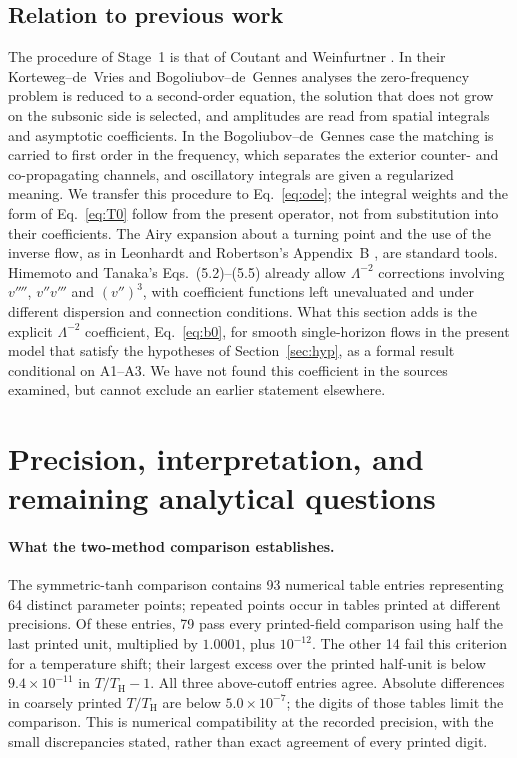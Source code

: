 \documentclass[10pt,a4paper]{article}
\newcommand{\HawkingT}{T_{\mathrm H}}
\begin{document}
\subsection{Relation to previous work}
The procedure of Stage~1 is that of Coutant and Weinfurtner
\cite{CWKdV,CWBdG}. In their Korteweg--de~Vries and Bogoliubov--de~Gennes
analyses the zero-frequency problem is reduced to a second-order equation,
the solution that does not grow on the subsonic side is selected, and
amplitudes are read from spatial integrals and asymptotic coefficients. In
the Bogoliubov--de~Gennes case the matching is carried to first order in
the frequency, which separates the exterior counter- and co-propagating
channels, and oscillatory integrals are given a regularized meaning. We transfer this procedure to Eq.~\eqref{eq:ode};
the integral weights and the form of Eq.~\eqref{eq:T0} follow from the
present operator, not from substitution into their coefficients. The Airy
expansion about a turning point and the use of the inverse flow, as in
Leonhardt and Robertson's Appendix~B \cite{LR}, are standard tools.
Himemoto and Tanaka's Eqs.~(5.2)--(5.5) \cite{HT} already allow
$\Lambda^{-2}$ corrections involving $v''''$, $v''v'''$ and $(v'')^3$,
with coefficient functions left unevaluated and under different dispersion
and connection conditions. What this section adds is the explicit
$\Lambda^{-2}$ coefficient, Eq.~\eqref{eq:b0}, for smooth single-horizon
flows in the present model that satisfy the hypotheses of
Section~\ref{sec:hyp}, as a formal result conditional on A1--A3. We have
not found this coefficient in the sources examined, but cannot exclude an
earlier statement elsewhere.

\clearpage
\section{Precision, interpretation, and remaining analytical questions}
\label{sec:discussion}
\paragraph{What the two-method comparison establishes.}
The symmetric-tanh comparison contains 93 numerical table entries
representing 64 distinct parameter points; repeated points occur in
tables printed at different precisions. Of these entries, 79 pass every
printed-field comparison using half the last printed unit, multiplied
by $1.0001$, plus $10^{-12}$. The other 14 fail this criterion for a
temperature shift; their largest excess over the printed half-unit is
below $9.4\times10^{-11}$ in $T/\HawkingT-1$. All three above-cutoff entries
agree. Absolute differences in coarsely printed $T/\HawkingT$ are below
$5.0\times10^{-7}$; the digits of those tables limit the comparison.
This is numerical compatibility at the recorded precision, with the
small discrepancies stated, rather than exact agreement of every
printed digit.
\end{document}
